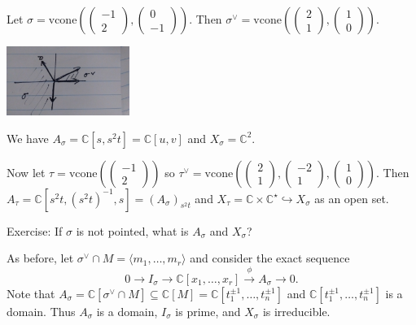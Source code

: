 \documentclass[a4paper,12pt]{amsart}
\newcommand{\CC}{\mathbb{C}}
\begin{document}
\begin{Eg}
Let $\sigma = \mathrm{vcone}\left(\begin{pmatrix}-1\\2\end{pmatrix}, \begin{pmatrix}0\\-1\end{pmatrix}\right)$.
Then $\sigma^\vee = \mathrm{vcone}\left(\begin{pmatrix}2\\1\end{pmatrix}, \begin{pmatrix}1\\0\end{pmatrix}\right)$.

\includegraphics[width=0.3\textwidth]{pic/lec04-pic3}

We have $A_\sigma = \CC[s, s^2t] = \CC[u, v]$ and $X_\sigma = \CC^2$.

Now let $\tau = \mathrm{vcone}\left(\begin{pmatrix}-1\\2\end{pmatrix}\right)$ so $\tau^\vee = \mathrm{vcone}\left(\begin{pmatrix}2\\1\end{pmatrix}, \begin{pmatrix}-2\\1\end{pmatrix}, \begin{pmatrix}1\\0\end{pmatrix}\right)$.
Then $A_\tau = \CC[s^2t, (s^2t)^{-1}, s] = (A_\sigma)_{s^2t}$ and $X_\tau = \CC \times \CC^\star \hookrightarrow X_\sigma$ as an open set.
\end{Eg}

Exercise: If $\sigma$ is not pointed, what is $A_\sigma$ and $X_\sigma$?

As before, let $\sigma^\vee \cap M = \langle m_1, \dots, m_r \rangle$ and consider the exact sequence
\[
0 \to I_\sigma \to \CC[x_1, \dots, x_r] \overset{\phi}{\to} A_\sigma \to 0.
\]
Note that $A_\sigma = \CC[\sigma^\vee \cap M] \subseteq \CC[M] = \CC[t_1^{\pm 1}, \dots, t_n^{\pm 1}]$ and $\CC[t_1^{\pm 1}, \dots, t_n^{\pm 1}]$ is a domain.
Thus $A_\sigma$ is a domain, $I_\sigma$ is prime, and $X_\sigma$ is irreducible.
\end{document}
